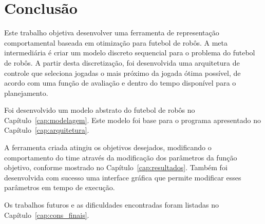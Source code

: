 \chapter*{Conclusão}\label{cap:conclusao}

Este trabalho objetiva desenvolver uma ferramenta de representação
comportamental baseada em otimização para futebol de robôs.
A meta intermediária é criar um modelo discreto sequencial
para o problema do futebol de robôs. A partir desta
discretização, foi desenvolvida uma arquitetura de controle
que seleciona jogadas o mais próximo da jogada ótima possível,
de acordo com uma função de avaliação e dentro do tempo disponível
para o planejamento.

Foi desenvolvido um modelo abstrato do futebol de robôs no
Capítulo~\ref{cap:modelagem}. Este modelo foi base para o
programa apresentado no Capítulo~\ref{cap:arquitetura}.

A ferramenta criada atingiu os objetivos desejados, modificando o
comportamento do time através da modificação dos parâmetros da função
objetivo, conforme mostrado no Capítulo~\ref{cap:resultados}. Também foi
desenvolvida com sucesso uma interface gráfica que permite modificar
esses parâmetros em tempo de execução.

Os trabalhos futuros e as dificuldades encontradas foram listadas no
Capítulo~\ref{cap:cons_finais}.

